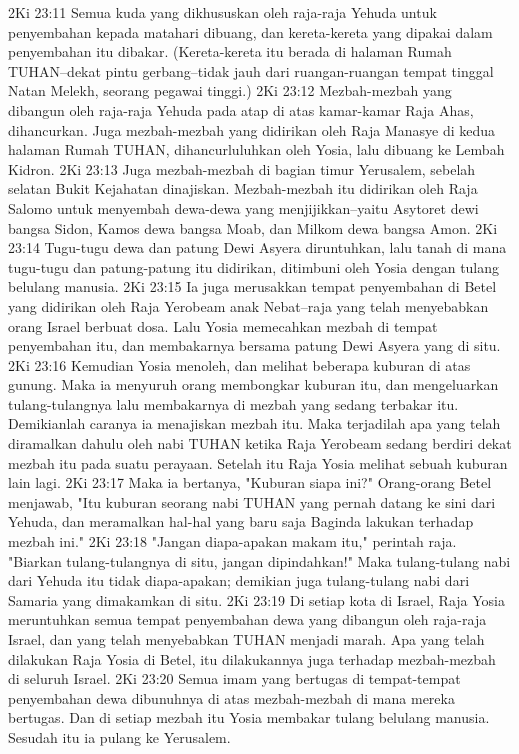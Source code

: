 2Ki 23:11  Semua kuda yang dikhususkan oleh raja-raja Yehuda untuk penyembahan kepada matahari dibuang, dan kereta-kereta yang dipakai dalam penyembahan itu dibakar. (Kereta-kereta itu berada di halaman Rumah TUHAN--dekat pintu gerbang--tidak jauh dari ruangan-ruangan tempat tinggal Natan Melekh, seorang pegawai tinggi.)
2Ki 23:12  Mezbah-mezbah yang dibangun oleh raja-raja Yehuda pada atap di atas kamar-kamar Raja Ahas, dihancurkan. Juga mezbah-mezbah yang didirikan oleh Raja Manasye di kedua halaman Rumah TUHAN, dihancurluluhkan oleh Yosia, lalu dibuang ke Lembah Kidron.
2Ki 23:13  Juga mezbah-mezbah di bagian timur Yerusalem, sebelah selatan Bukit Kejahatan dinajiskan. Mezbah-mezbah itu didirikan oleh Raja Salomo untuk menyembah dewa-dewa yang menjijikkan--yaitu Asytoret dewi bangsa Sidon, Kamos dewa bangsa Moab, dan Milkom dewa bangsa Amon.
2Ki 23:14  Tugu-tugu dewa dan patung Dewi Asyera diruntuhkan, lalu tanah di mana tugu-tugu dan patung-patung itu didirikan, ditimbuni oleh Yosia dengan tulang belulang manusia.
2Ki 23:15  Ia juga merusakkan tempat penyembahan di Betel yang didirikan oleh Raja Yerobeam anak Nebat--raja yang telah menyebabkan orang Israel berbuat dosa. Lalu Yosia memecahkan mezbah di tempat penyembahan itu, dan membakarnya bersama patung Dewi Asyera yang di situ.
2Ki 23:16  Kemudian Yosia menoleh, dan melihat beberapa kuburan di atas gunung. Maka ia menyuruh orang membongkar kuburan itu, dan mengeluarkan tulang-tulangnya lalu membakarnya di mezbah yang sedang terbakar itu. Demikianlah caranya ia menajiskan mezbah itu. Maka terjadilah apa yang telah diramalkan dahulu oleh nabi TUHAN ketika Raja Yerobeam sedang berdiri dekat mezbah itu pada suatu perayaan. Setelah itu Raja Yosia melihat sebuah kuburan lain lagi.
2Ki 23:17  Maka ia bertanya, "Kuburan siapa ini?" Orang-orang Betel menjawab, "Itu kuburan seorang nabi TUHAN yang pernah datang ke sini dari Yehuda, dan meramalkan hal-hal yang baru saja Baginda lakukan terhadap mezbah ini."
2Ki 23:18  "Jangan diapa-apakan makam itu," perintah raja. "Biarkan tulang-tulangnya di situ, jangan dipindahkan!" Maka tulang-tulang nabi dari Yehuda itu tidak diapa-apakan; demikian juga tulang-tulang nabi dari Samaria yang dimakamkan di situ.
2Ki 23:19  Di setiap kota di Israel, Raja Yosia meruntuhkan semua tempat penyembahan dewa yang dibangun oleh raja-raja Israel, dan yang telah menyebabkan TUHAN menjadi marah. Apa yang telah dilakukan Raja Yosia di Betel, itu dilakukannya juga terhadap mezbah-mezbah di seluruh Israel.
2Ki 23:20  Semua imam yang bertugas di tempat-tempat penyembahan dewa dibunuhnya di atas mezbah-mezbah di mana mereka bertugas. Dan di setiap mezbah itu Yosia membakar tulang belulang manusia. Sesudah itu ia pulang ke Yerusalem.
